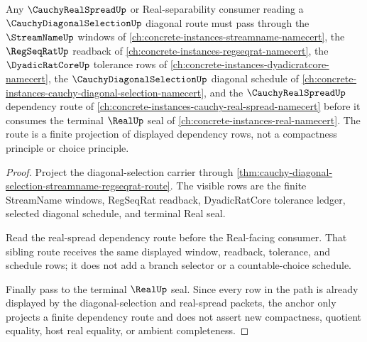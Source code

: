 \begin{theorem}
\label{thm:cauchy-diagonal-selection-real-spread-anchor}
Any $\CauchyRealSpreadUp$ or Real-separability consumer reading a $\CauchyDiagonalSelectionUp$ diagonal route must pass through the $\StreamNameUp$ windows of \autoref{ch:concrete-instances-streamname-namecert}, the $\RegSeqRatUp$ readback of \autoref{ch:concrete-instances-regseqrat-namecert}, the $\DyadicRatCoreUp$ tolerance rows of \autoref{ch:concrete-instances-dyadicratcore-namecert}, the $\CauchyDiagonalSelectionUp$ diagonal schedule of \autoref{ch:concrete-instances-cauchy-diagonal-selection-namecert}, and the $\CauchyRealSpreadUp$ dependency route of \autoref{ch:concrete-instances-cauchy-real-spread-namecert} before it consumes the terminal $\RealUp$ seal of \autoref{ch:concrete-instances-real-namecert}. The route is a finite projection of displayed dependency rows, not a compactness principle or choice principle.
\end{theorem}
\begin{proof}
Project the diagonal-selection carrier through \autoref{thm:cauchy-diagonal-selection-streamname-regseqrat-route}. The visible rows are the finite StreamName windows, RegSeqRat readback, DyadicRatCore tolerance ledger, selected diagonal schedule, and terminal Real seal.

Read the real-spread dependency route before the Real-facing consumer. That sibling route receives the same displayed window, readback, tolerance, and schedule rows; it does not add a branch selector or a countable-choice schedule.

Finally pass to the terminal $\RealUp$ seal. Since every row in the path is already displayed by the diagonal-selection and real-spread packets, the anchor only projects a finite dependency route and does not assert new compactness, quotient equality, host real equality, or ambient completeness.
\end{proof}

